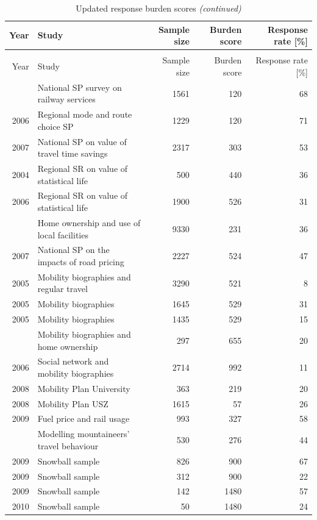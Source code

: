\documentclass[a4paper]{article}\usepackage[]{graphicx}\usepackage[]{xcolor}
\begin{document}
\begin{landscape}
\begin{longtable}[t]{rlrrr}
\caption{\label{tab:full_sample}Updated response burden scores}\\
\toprule
Year & Study & Sample size & Burden score & Response rate [\%]\\
\midrule
\endfirsthead
\caption[]{Updated response burden scores \textit{(continued)}}\\
\toprule
Year & Study & Sample size & Burden score & Response rate [\%]\\
\midrule
\endhead

\endfoot
\bottomrule
\endlastfoot
2004 & National SP survey on railway services & 1561 & 120 & 68\\
2006 & Regional mode and route choice SP & 1229 & 120 & 71\\
2007 & National SP on value of travel time savings & 2317 & 303 & 53\\
2004 & Regional SR on value of statistical life & 500 & 440 & 36\\
2006 & Regional SR on value of statistical life & 1900 & 526 & 31\\
\addlinespace
2005 & Home ownership and use of local facilities & 9330 & 231 & 36\\
2007 & National SP on the impacts of road pricing & 2227 & 524 & 47\\
2005 & Mobility biographies and regular travel & 3290 & 521 & 8\\
2005 & Mobility biographies & 1645 & 529 & 31\\
2005 & Mobility biographies & 1435 & 529 & 15\\
\addlinespace
2004 & Mobility biographies and home ownership & 297 & 655 & 20\\
2006 & Social network and mobility biographies & 2714 & 992 & 11\\
2008 & Mobility Plan University & 363 & 219 & 20\\
2008 & Mobility Plan USZ & 1615 & 57 & 26\\
2009 & Fuel price and rail usage & 993 & 327 & 58\\
\addlinespace
2009 & Modelling mountaineers' travel behaviour & 530 & 276 & 44\\
2009 & Snowball sample & 826 & 900 & 67\\
2009 & Snowball sample & 312 & 900 & 22\\
2009 & Snowball sample & 142 & 1480 & 57\\
2010 & Snowball sample & 50 & 1480 & 24\\

\end{longtable}
\end{landscape}
\end{document}
